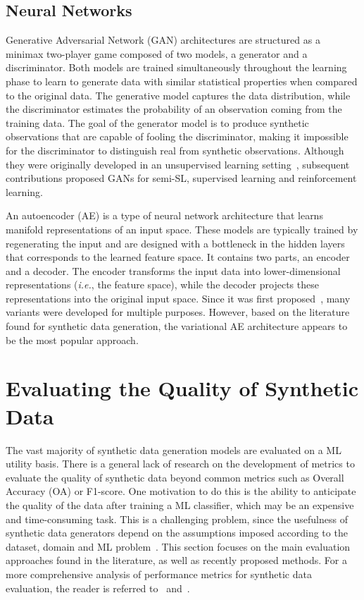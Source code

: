 \documentclass[parskip=full]{scrartcl}
\begin{document}
\subsection{Neural Networks}

Generative Adversarial Network (GAN) architectures are structured as a minimax
two-player game composed of two models, a generator and a discriminator. Both
models are trained simultaneously throughout the learning phase to learn to
generate data with similar statistical properties when compared to the
original data. The generative model captures the data distribution, while the
discriminator estimates the probability of an observation coming from the
training data. The goal of the generator model is to produce synthetic
observations that are capable of fooling the discriminator, making it
impossible for the discriminator to distinguish real from synthetic
observations.  Although they were originally developed in an unsupervised
learning setting~\cite{goodfellow2020generative}, subsequent contributions
proposed GANs for semi-SL, supervised learning and reinforcement learning.

An autoencoder (AE) is a type of neural network architecture that learns
manifold representations of an input space. These models are typically trained
by regenerating the input and are designed with a bottleneck in the hidden
layers that corresponds to the learned feature space. It contains two parts,
an encoder and a decoder. The encoder transforms the input data into
lower-dimensional representations (\textit{i.e.}, the feature space), while
the decoder projects these representations into the original input space.
Since it was first proposed~\cite{ackley1985learning}, many variants were
developed for multiple purposes. However, based on the literature found for
synthetic data generation, the variational AE architecture appears to be the
most popular approach.

\section{Evaluating the Quality of Synthetic Data
}\label{sec:evaluating-synthetic-data}

The vast majority of synthetic data generation models are evaluated on a ML
utility basis. There is a general lack of research on the development of
metrics to evaluate the quality of synthetic data beyond common metrics such
as Overall Accuracy (OA) or F1-score. One motivation to do this is the ability
to anticipate the quality of the data after training a ML classifier, which
may be an expensive and time-consuming task. This is a challenging problem,
since the usefulness of synthetic data generators depend on the assumptions
imposed according to the dataset, domain and ML
problem~\cite{chundawat2022tabsyndex}. This section focuses on the main
evaluation approaches found in the literature, as well as recently proposed
methods. For a more comprehensive analysis of performance metrics for
synthetic data evaluation, the reader is referred to~\cite{dankar2022multi}
and~\cite{theis2016note}.
\end{document}
